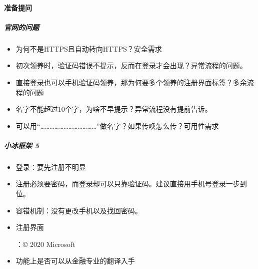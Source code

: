 \documentclass[letterpaper,10pt,english]{sphinxmanual}
\begin{document}
\paragraph{准备提问}
\label{\detokenize{chapter_AI_company/xiaoice:id18}}

\subparagraph{官网的问题}
\label{\detokenize{chapter_AI_company/xiaoice:id19}}\begin{itemize}
\item {} 
为何不是HTTPS且自动转向HTTPS？安全需求

\item {} 
初次领养时，验证码错误不提示，反而在登录才会出现？异常流程的问题。

\item {} 
直接登录也可以手机验证码领养，那为何要多个领养的注册界面标签？多余流程的问题

\item {} 
名字不能超过10个字，为啥不早提示？异常流程没有提前告诉。

\item {} 
可以用“………………………………”做名字？如果传唤怎么传？可用性需求

\end{itemize}


\subparagraph{小冰框架 5\sphinxfootnotemark[1067]}
\label{\detokenize{chapter_AI_company/xiaoice:id20}}%
\begin{footnotetext}[1067]\sphinxAtStartFootnote
{}
%
\end{footnotetext}\ignorespaces \begin{itemize}
\item {} 
登录：要先注册不明显

\item {} 
注册必须要密码，而登录却可以只靠验证码。建议直接用手机号登录一步到位。

\item {} 
容错机制：没有更改手机以及找回密码。

\item {} 
注册界面 %
\begin{footnote}[1068]\sphinxAtStartFootnote
{}
%
\end{footnote}：© 2020 Microsoft

\item {} 
功能上是否可以从金融专业的翻译入手%
\begin{footnote}[1069]\sphinxAtStartFootnote
{}
%
\end{footnote}

\end{itemize}
\end{document}
